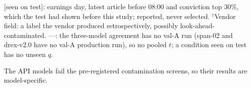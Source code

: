 \begin{landscape}
{[seen on test]: earnings day, latest article before 08:00 and conviction top 30\%, which the test had shown before this study; reported, never selected. $^{\dagger}$Vendor field: a label the vendor produced retrospectively, possibly look-ahead-contaminated. ---: the three-model agreement has no val-A run (span-02 and drex-v2.0 have no val-A production run), so no pooled $t$; a condition seen on test has no unseen $q$.\par
The API models fail the pre-registered contamination screens, so their results are model-specific.\par
}
\end{landscape}
